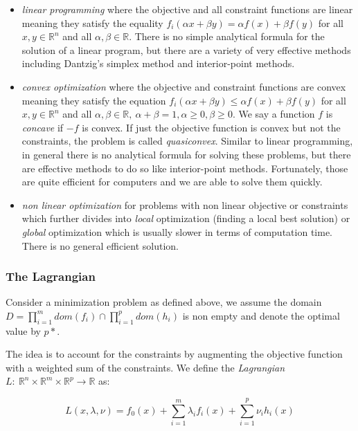 \documentclass{article}
\begin{document}
\begin{itemize}
\item
  \emph{linear programming} where the objective and all constraint
  functions are linear meaning they satisfy the equality
  \(f_i(\alpha x+ \beta y) = \alpha f(x)
  + \beta f(y)\) for all \(x, y \in \mathbb{R}^n\) and all
  \(\alpha, \beta \in
  \mathbb{R}\). There is no simple analytical formula for the solution
  of a linear program, but there are a variety of very effective methods
  including Dantzig's simplex method and interior-point methods.
\item
  \emph{convex optimization} where the objective and constraint
  functions are convex meaning they satisfy the equation
  \(f_i(\alpha x+ \beta y) \le \alpha f(x) +
  \beta f(y)\) for all \(x, y \in \mathbb{R}^n\) and all
  \(\alpha , \beta \in
  \mathbb{R},\ \alpha + \beta = 1, \alpha \ge 0, \beta \ge 0\). We say a
  function \(f\) is \emph{concave} if \(-f\) is convex. If just the
  objective function is convex but not the constraints, the problem is
  called \emph{quasiconvex}. Similar to linear programming, in general
  there is no analytical formula for solving these problems, but there
  are effective methods to do so like interior-point methods.
  Fortunately, those are quite efficient for computers and we are able
  to solve them quickly.
\item
  \emph{non linear optimization} for problems with non linear objective
  or constraints which further divides into \emph{local} optimization
  (finding a local best solution) or \emph{global} optimization which is
  usually slower in terms of computation time. There is no general
  efficient solution.
\end{itemize}

\subsubsection{The Lagrangian}\label{the-lagrangian}

Consider a minimization problem as defined above, we assume the domain
\(D=\prod_{i=1}^m dom(f_i) \cap \prod_{i=1}^p dom(h_i)\) is non empty
and denote the optimal value by \(p*\).

The idea is to account for the constraints by augmenting the objective
function with a weighted sum of the constraints. We define the
\emph{Lagrangian}
\(L:\ \mathbb{R}^n \times \mathbb{R}^m \times \mathbb{R}^p
\rightarrow \mathbb{R}\) as:

\[L(x, \lambda, \nu) = f_0(x) + \sum_{i=1}^m \lambda_i f_i(x) +
\sum_{i=1}^p \nu_i h_i(x)\]
\end{document}
